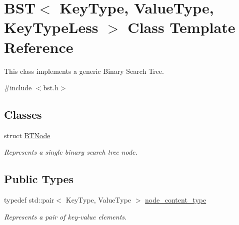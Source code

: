 \hypertarget{class_b_s_t}{}\section{B\+ST$<$ Key\+Type, Value\+Type, Key\+Type\+Less $>$ Class Template Reference}
\label{class_b_s_t}


This class implements a generic Binary Search Tree.  




{\ttfamily \#include $<$bst.\+h$>$}

\subsection*{Classes}
\begin{DoxyCompactItemize}
\item 
struct \hyperlink{struct_b_s_t_1_1_b_t_node}{B\+T\+Node}
\begin{DoxyCompactList}\small\item\em Represents a single binary search tree node. \end{DoxyCompactList}\end{DoxyCompactItemize}
\subsection*{Public Types}
\begin{DoxyCompactItemize}
\item 
typedef std\+::pair$<$ Key\+Type, Value\+Type $>$ \hyperlink{class_b_s_t_a0aa9307cbee74945dbbbf659c398d4a1}{node\+\_\+content\+\_\+type}
\begin{DoxyCompactList}\small\item\em Represents a pair of key-\/value elements. \end{DoxyCompactList}\end{DoxyCompactItemize}
